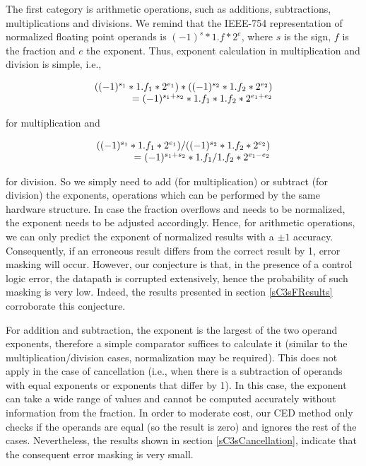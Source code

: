\documentclass[12pt]{yalephd}
\newcommand{\subsubsubsection}[1] {\noindent {\underline {#1}}}
\begin{document}
\subsubsubsection{Arithmetic operations}\label{sC3sArithmetic}

The first category is arithmetic operations, such as additions, subtractions, multiplications and divisions. We remind that the IEEE-754 representation of normalized floating point operands is $(-1)^{s} * 1.{f} * 2^{e}$, where $s$ is the sign, $f$ is the fraction and $e$ the exponent. Thus, exponent calculation in multiplication and division is simple, i.e.,

\begin{equation}
\begin{array}{c}
((-1)^{s_1} * 1.{f_1} * 2^{e_1}) * ((-1)^{s_2} * 1.{f_2} * 2^{e_2}) \\
\multicolumn{1}{r}{ = (-1)^{s_1+s_2} * 1.f_1*1.f_2 * 2^{e_1+e_2} }
\end{array}
\label{eqm}
\end{equation}

\noindent for multiplication and

\begin{equation}
\begin{array}{c}
((-1)^{s_1} * 1.{f_1} * 2^{e_1}) / ((-1)^{s_2} * 1.{f_2} * 2^{e_2}) \\
\multicolumn{1}{r}{ = (-1)^{s_1+s_2} * 1.f_1/1.f_2 * 2^{e_1-e_2} }
\end{array}
\label{eqd}
\end{equation}

\noindent for division. So we simply need to add (for multiplication) or subtract (for division) the exponents, operations which can be performed by the same hardware structure. In case the fraction overflows and needs to be normalized, the exponent needs to be adjusted accordingly. Hence, for arithmetic operations, we can only predict the exponent of normalized results with a $\pm 1$ accuracy. Consequently, if an erroneous result differs from the correct result by 1, error masking will occur. However, our conjecture is that, in the presence of a control logic error, the datapath is corrupted extensively, hence the probability of such masking is very low. Indeed, the results presented in section \ref{sC3sFResults} corroborate this conjecture.

For addition and subtraction, the exponent is the largest of the two operand exponents, therefore a simple comparator suffices to calculate it (similar to the multiplication/division cases, normalization may be required). This does not apply in the case of cancellation (i.e., when there is a subtraction of operands with equal exponents or exponents that differ by 1). In this case, the exponent can take a wide range of values and cannot be computed accurately without information from the fraction. In order to moderate cost, our CED method only checks if the operands are equal (so the result is zero) and ignores the rest of the cases. Nevertheless, the results shown in section \ref{sC3sCancellation}, indicate that the consequent error masking is very small.
\end{document}
